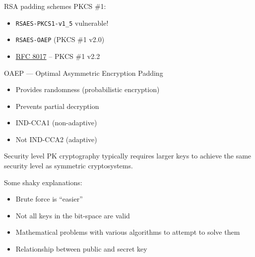 \begin{frame}{RSA padding schemes}
  \pause
  PKCS \#1:
  \begin{itemize}[<+(1)->]
    \item \texttt{RSAES-PKCS1-v1\_5} vulnerable!
    \item \texttt{RSAES-OAEP} (PKCS \#1 v2.0)
    \item \href{https://datatracker.ietf.org/doc/html/rfc8017}{RFC 8017} -- PKCS \#1 v2.2
  \end{itemize}

  \pause
  OAEP --- Optimal Asymmetric Encryption Padding
  \begin{itemize}[<+(1)->]
    \item Provides randomness (probabilistic encryption)
    \item Prevents partial decryption
    \item IND-CCA1 (non-adaptive)
    \item Not IND-CCA2 (adaptive)
  \end{itemize}
\end{frame}

\begin{frame}{Security level}
  PK cryptography typically requires larger keys to achieve the same security level as symmetric cryptosystems.

  \pause
  Some shaky explanations:
  \begin{itemize}[<+(1)->]
    \item Brute force is \enquote{easier}
    \item Not all keys in the bit-space are valid
    \item Mathematical problems with various algorithms to attempt to solve them
    \item Relationship between public and secret key
  \end{itemize}
\end{frame}

